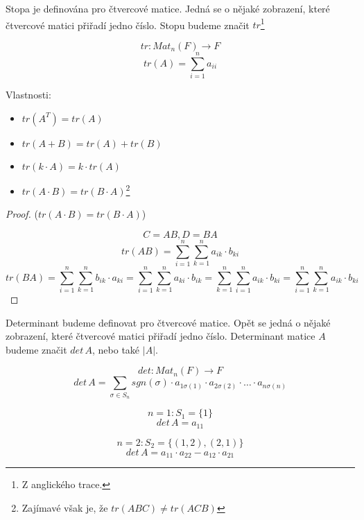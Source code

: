 \begin{definition}[Stopa]
    Stopa je definována pro čtvercové matice. Jedná se o nějaké zobrazení,
    které čtvercové matici přiřadí jedno číslo. Stopu budeme značit
    $tr$\footnote{Z anglického trace.}

    $$tr: Mat_n(F) \rightarrow F$$
    $$tr(A) = \sum_{i=1}^na_{ii}$$

    Vlastnosti:
    \begin{itemize}
        \item $tr(A^T) = tr(A)$
        \item $tr(A + B) = tr(A) + tr(B)$
        \item $tr(k \cdot A) = k \cdot tr(A)$
        \item $tr(A\cdot B) = tr(B \cdot A)$\footnote{Zajímavé však je, že
        $tr(ABC) \neq tr(ACB)$}
    \end{itemize}

\end{definition}
\begin{proof}
    ($tr(A\cdot B) = tr(B \cdot A)$)

    $$C = AB, D = BA$$
    $$tr(AB) = \sum_{i=1}^n\sum_{k=1}^n a_{ik} \cdot b_{ki}$$
    $$tr(BA) = \sum_{i=1}^n\sum_{k=1}^n b_{ik} \cdot a_{ki} = \sum_{i=1}^n\sum_{k=1}^n a_{ki}
    \cdot b_{ik} = \sum_{k=1}^n\sum_{i=1}^n a_{ik} \cdot b_{ki} =
    \sum_{i=1}^n\sum_{k=1}^n a_{ik} \cdot b_{ki}$$

\end{proof}

\begin{definition}[Determinant]
    Determinant budeme definovat pro čtvercové matice.
    Opět se jedná o nějaké zobrazení, které čtvercové matici přiřadí
    jedno číslo. Determinant matice $A$ budeme značit $det\,A$, nebo také $|A|$.

    $$det: Mat_n(F) \rightarrow F$$
    $$det\, A = \sum_{\sigma \in S_n} sgn(\sigma) \cdot a_{1\sigma(1)} \cdot a_{2\sigma(2)}
    \cdot \ldots \cdot a_{n\sigma(n)}$$
\end{definition}

\begin{example}
    $$n = 1: S_1=\{1\}$$
    $$det\,A = a_{11}$$
\end{example}

\begin{example}
    $$n = 2: S_2=\{(1,2), (2,1)\}$$
    $$det\,A = a_{11} \cdot a_{22} - a_{12} \cdot a_{21}$$
\end{example}

